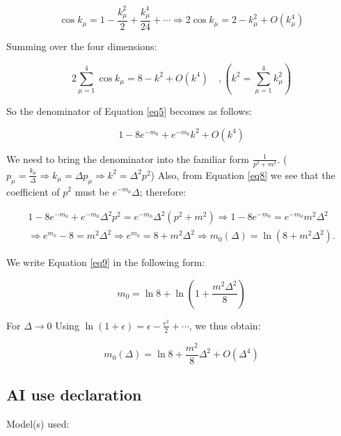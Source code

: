 \documentclass[12pt]{report}
\begin{document}
\begin{equation}
\cos k_\mu = 1 - \frac{k_\mu^2}{2} + \frac{k_\mu^4}{24} + \cdots \Rightarrow 2\cos k_\mu = 2 - k_\mu^2 + O(k_\mu^4)
\label{eq6}
\end{equation}

Summing over the four dimensions:

\begin{equation}
2\sum_{\mu=1}^4 \cos k_\mu = 8 - k^2 + O(k^4) \quad ,(k^2 = \sum_{\mu=1}^4 k_\mu^2)
\label{eq7}
\end{equation}

So the denominator of Equation \eqref{eq5} becomes as follows:

\begin{equation}
1 - 8e^{-m_0} + e^{-m_0} k^2 + O(k^4)
\label{eq8}
\end{equation}

We need to bring the denominator into the familiar form $\frac{1}{p^2+m^2}$. ($p_\mu=\frac{k_\mu}{\Delta} \Rightarrow k_\mu=\Delta p_\mu \Rightarrow k^2=\Delta^2p^2$) Also, from Equation \eqref{eq8} we see that the coefficient of \(p^2\) must be \(e^{-m_0}\Delta\); therefore:

\begin{equation}
\begin{split}
1-8e^{-m_0}+e^{-m_0}\Delta^2p^2
=
e^{-m_0}\Delta^2(p^2+m^2) \Rightarrow 1-8e^{-m_0}=e^{-m_0}m^2\Delta^2 \\
\Rightarrow e^{m_0}-8=m^2\Delta^2 \Rightarrow e^{m_0}=8+m^2\Delta^2 \Rightarrow \boxed{
m_0(\Delta)=\ln(8+m^2\Delta^2).
}
\label{eq9}
\end{split} 
\end{equation}

We write Equation \eqref{eq9} in the following form:

\begin{equation}
m_0 = \ln 8 + \ln\left(1+\frac{m^2\Delta^2}{8}\right)
\label{eq10}
\end{equation}

For $\Delta \rightarrow 0$ Using $ \ln(1+\epsilon)=\epsilon-\frac{\epsilon^2}{2}+\cdots$, we thus obtain:

\begin{equation}
\boxed{\boxed{
m_0(\Delta)
=
\ln 8+\frac{m^2}{8}\Delta^2+O(\Delta^4)
}}
\label{eq11}
\end{equation}

\newpage
\subsection*{AI use declaration}
Model(s) used: 
\end{document}
